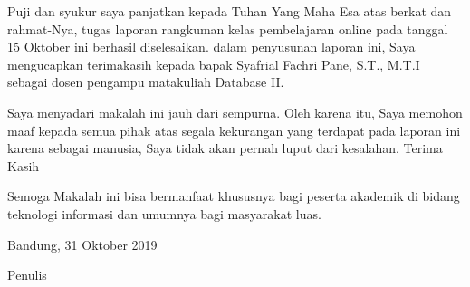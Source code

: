 \begin{acknowledgements}
Puji dan syukur saya panjatkan kepada Tuhan Yang Maha Esa atas berkat dan rahmat-Nya, tugas laporan rangkuman kelas pembelajaran online pada tanggal 15 Oktober ini berhasil diselesaikan. dalam penyusunan laporan ini, Saya mengucapkan terimakasih kepada bapak Syafrial Fachri Pane, S.T., M.T.I sebagai dosen pengampu matakuliah Database II.

Saya menyadari makalah ini jauh dari sempurna. Oleh karena itu, Saya memohon maaf kepada semua pihak atas segala kekurangan yang terdapat pada laporan ini karena sebagai manusia, Saya tidak akan pernah luput dari kesalahan. Terima Kasih 

Semoga Makalah ini bisa bermanfaat khususnya bagi peserta akademik di bidang teknologi informasi dan umumnya bagi masyarakat luas. 

\begin{raggedleft}

Bandung, 31 Oktober 2019

Penulis

\end{raggedleft}

\end{acknowledgements}